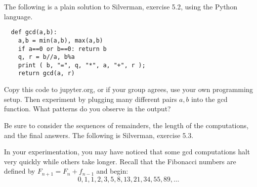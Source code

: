 \documentclass[12pt]{exam}
\begin{document}
\begin{questions}
  \question The following is a plain solution to Silverman, exercise 5.2, using the Python language.
  \begin{lstlisting}
  def gcd(a,b):
    a,b = min(a,b), max(a,b)
    if a==0 or b==0: return b
    q, r = b//a, b%a
    print ( b, "=", q, "*", a, "+", r );
    return gcd(a, r)
  \end{lstlisting}
  Copy this code to jupyter.org, or if your group agrees, use your own programming setup. Then experiment by plugging many different pairs $a,b$ into the gcd function. What patterns do you observe in the output?
  
  Be sure to consider the sequences of remainders, the length of the computations, and the final answers.
  \newpage
  \question The following is Silverman, exercise 5.3.
  \newpage
  \question In your experimentation, you may have noticed that some gcd computations halt very quickly while others take longer. Recall that the Fibonacci numbers are defined by $F_{n+1}=F_n+f_{n-1}$ and begin:
  \[0,1,1,2,3,5,8,13,21,34,55,89,\ldots
  \]
\end{questions}
\end{document}

